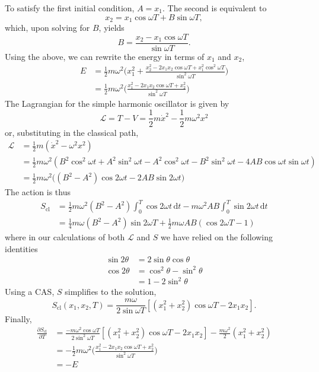 \documentclass[../principles-of-quantum-mechanics.tex]{subfiles}
\begin{document}
\begin{questions}
\begin{solution}
			To satisfy the first initial condition, $A = x_1$. The second is equivalent to
			\[
				x_2 = x_1\cos\omega T + B\sin\omega T,
			\]
			which, upon solving for $B$, yields
			\[
				B = \frac{x_2 - x_1\cos\omega T}{\sin\omega T}.
			\]
			Using the above, we can rewrite the energy in terms of $x_1$ and $x_2$,
			\begin{align*}
				E &= \frac{1}{2}m\omega^2\Big(x_1^2 + \frac{x_2^2 - 2x_1x_2\cos\omega T + x_1^2\cos^2\omega T}{\sin^2\omega T}\Big) \\
				&= \frac{1}{2}m\omega^2\Big(\frac{x_1^2 - 2x_1x_2\cos\omega T + x_2^2}{\sin^2\omega T}\Big)
			\end{align*}
			The Lagrangian for the simple harmonic oscillator is given by
			\[
				\mathcal{L} = T - V = \frac{1}{2}m\dot{x}^2 - \frac{1}{2}m\omega^2x^2
			\]
			or, substituting in the classical path,
			\begin{align*}
				\mathcal{L} &= \frac{1}{2}m(\dot{x}^2 - \omega^2x^2) \\
				&= \frac{1}{2}m\omega^2(B^2\cos^2\omega t + A^2\sin^2\omega t - A^2\cos^2\omega t - B^2\sin^2\omega t - 4AB\cos\omega t\sin\omega t) \\
				&= \frac{1}{2}m\omega^2\Big((B^2 - A^2)\cos2\omega t - 2AB\sin2\omega t\Big)
			\end{align*}
			The action is thus
			\begin{align*}
				S_{\text{cl}} &= \frac{1}{2}m\omega^2(B^2 - A^2)\int_0^T\cos 2\omega t\,\mathrm{d}t - m\omega^2AB\int_0^T\sin2\omega t\,\mathrm{d}t \\
				&= \frac{1}{4}m\omega(B^2-A^2)\sin2\omega T + \frac{1}{2}m\omega AB(\cos2\omega T - 1)
			\end{align*}
			where in our calculations of both $\mathcal{L}$ and $S$ we have relied on the following identities
			\begin{align*}
				\sin2\theta &= 2\sin\theta\cos\theta \\
				\cos2\theta &= \cos^2\theta - \sin^2\theta \\
				&= 1 - 2\sin^2\theta
			\end{align*}
			Using a CAS, $S$ simplifies to the solution,
			\[
				S_{\text{cl}}(x_1, x_2, T) = \frac{m\omega}{2\sin\omega T}[(x_1^2+x_2^2)\cos\omega T - 2x_1x_2].
			\]
			Finally, 
			\begin{align*}
				\frac{\partial S_{\text{cl}}}{\partial T} &= \frac{-m\omega^2\cos\omega T}{2\sin^2\omega T}[(x_1^2+x_2^2)\cos\omega T - 2x_1x_2] - \frac{m\omega^2}{2}(x_1^2+x_2^2) \\
				&= -\frac{1}{2}m\omega^2\Big(\frac{x_1^2 - 2x_1x_2\cos\omega T + x_2^2}{\sin^2\omega T}\Big) \\
				&= -E
			\end{align*}
		\end{solution}
	\end{questions}
\end{document}
